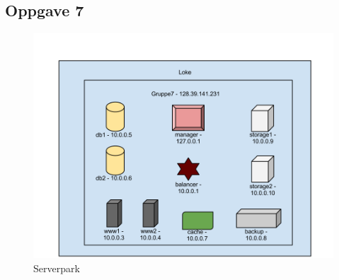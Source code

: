 \documentclass[a4paper, norsk, 12pt]{article}
\begin{document}
\subsection{Oppgave 7}
\begin{figure}[h!]
 \centering
  \includegraphics[width=1\textwidth]{Images/Gruppe7-IMT3441_Serverpark.png}
  \caption{Serverpark}
\end{figure}
\end{document}
